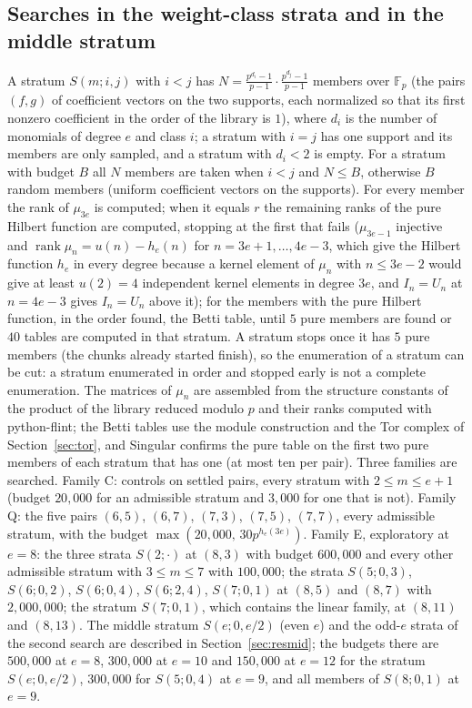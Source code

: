 \documentclass[11pt]{article}
\theoremstyle{definition}
\theoremstyle{remark}
\newcommand{\F}{\mathbb{F}}
\begin{document}
\subsection{Searches in the weight-class strata and in the middle stratum}
\label{sec:strsearch}

A stratum $S(m;i,j)$ with $i<j$ has $N=\frac{p^{d_i}-1}{p-1}\cdot\frac{p^{d_j}-1}{p-1}$ members over $\F_p$ (the pairs $(f,g)$ of coefficient vectors on the two supports, each normalized so that its first nonzero coefficient in the order of the library is $1$), where $d_i$ is the number of monomials of degree $e$ and class $i$; a stratum with $i=j$ has one support and its members are only sampled, and a stratum with $d_i<2$ is empty. For a stratum with budget $B$ all $N$ members are taken when $i<j$ and $N\le B$, otherwise $B$ random members (uniform coefficient vectors on the supports). For every member the rank of $\mu_{3e}$ is computed; when it equals $r$ the remaining ranks of the pure Hilbert function are computed, stopping at the first that fails ($\mu_{3e-1}$ injective and $\operatorname{rank}\mu_n=u(n)-h_e(n)$ for $n=3e+1,\dots,4e-3$, which give the Hilbert function $h_e$ in every degree because a kernel element of $\mu_n$ with $n\le3e-2$ would give at least $u(2)=4$ independent kernel elements in degree $3e$, and $I_n=U_n$ at $n=4e-3$ gives $I_n=U_n$ above it); for the members with the pure Hilbert function, in the order found, the Betti table, until $5$ pure members are found or $40$ tables are computed in that stratum. A stratum stops once it has $5$ pure members (the chunks already started finish), so the enumeration of a stratum can be cut: a stratum enumerated in order and stopped early is not a complete enumeration. The matrices of $\mu_n$ are assembled from the structure constants of the product of the library reduced modulo $p$ and their ranks computed with python-flint; the Betti tables use the module construction and the Tor complex of Section~\ref{sec:tor}, and Singular confirms the pure table on the first two pure members of each stratum that has one (at most ten per pair). Three families are searched. Family C: controls on settled pairs, every stratum with $2\le m\le e+1$ (budget $20{,}000$ for an admissible stratum and $3{,}000$ for one that is not). Family Q: the five pairs $(6,5)$, $(6,7)$, $(7,3)$, $(7,5)$, $(7,7)$, every admissible stratum, with the budget $\max(20{,}000,\,30p^{h_e(3e)})$. Family E, exploratory at $e=8$: the three strata $S(2;\cdot)$ at $(8,3)$ with budget $600{,}000$ and every other admissible stratum with $3\le m\le7$ with $100{,}000$; the strata $S(5;0,3)$, $S(6;0,2)$, $S(6;0,4)$, $S(6;2,4)$, $S(7;0,1)$ at $(8,5)$ and $(8,7)$ with $2{,}000{,}000$; the stratum $S(7;0,1)$, which contains the linear family, at $(8,11)$ and $(8,13)$. The middle stratum $S(e;0,e/2)$ (even $e$) and the odd-$e$ strata of the second search are described in Section~\ref{sec:resmid}; the budgets there are $500{,}000$ at $e=8$, $300{,}000$ at $e=10$ and $150{,}000$ at $e=12$ for the stratum $S(e;0,e/2)$, $300{,}000$ for $S(5;0,4)$ at $e=9$, and all members of $S(8;0,1)$ at $e=9$.
\end{document}
